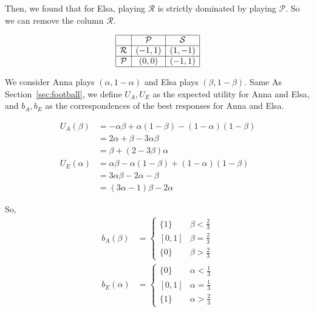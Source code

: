 \documentclass{article}
\begin{document}
    Then, we found that for Elsa, playing $\mathcal{R}$ is strictly dominated by playing $\mathcal{P}$. So we can remove the column $\mathcal{R}$. 

    \[
    \begin{array}{|c|c|c|c|}
    \hline
     & \mathcal{P} & \mathcal{S} \\ \hline
    \mathcal{R} & (-1,1) & (1,-1) \\ \hline
    \mathcal{P} & (0,0) & (-1,1) \\ \hline
    \end{array}
    \]

    We consider Anna plays $(\alpha, 1-\alpha)$ and Elsa plays $(\beta, 1-\beta)$. Same As Section~\ref{sec:football}, we define $U_A, U_E$ as the expected utility for Anna and Elsa, and $b_A, b_E$ as the correspondences of the best responses for Anna and Elsa.
    
    \begin{align*}
        U_A(\beta) &= -\alpha\beta+\alpha(1-\beta)-(1-\alpha)(1-\beta)\\
        &=2\alpha+\beta-3\alpha\beta\\
        &=\beta+(2-3\beta)\alpha\\
        U_E(\alpha) &= \alpha\beta-\alpha(1-\beta)+(1-\alpha)(1-\beta)\\
        &=3\alpha\beta-2\alpha-\beta\\
        &=(3\alpha-1)\beta-2\alpha
    \end{align*}

    So,
    \begin{align*}
        b_A(\beta)&=\begin{cases}
            \{1\}&\beta<\frac{2}{3}\\
            [0, 1]&\beta=\frac{2}{3}\\
            \{0\}&\beta>\frac{2}{3}
        \end{cases}\\
        b_E(\alpha)&=\begin{cases}
            \{0\}&\alpha<\frac{1}{3}\\
            [0, 1]&\alpha=\frac{1}{3}\\
            \{1\}&\alpha>\frac{2}{3}
        \end{cases}
    \end{align*}
\end{document}
